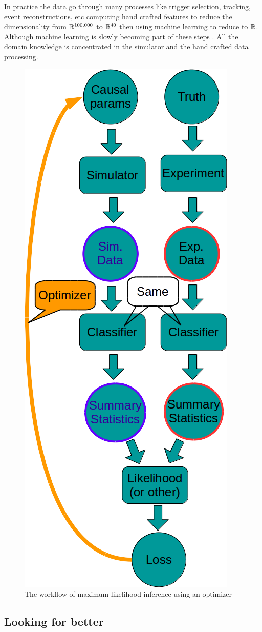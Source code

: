 In practice the data go through many processes like trigger selection, tracking, event reconstructions, etc computing hand crafted features to reduce the dimensionality from $\mathbb{R}^{100,000}$ to $\mathbb{R}^{40}$ then using machine learning to reduce to $\mathbb{R}$.
Although machine learning is slowly becoming part of these steps \needcite.
All the domain knowledge is concentrated in the simulator and the hand crafted data processing.


\begin{figure}[htb]
    \centering
    \includegraphics[width=0.5\linewidth]{workflow}
    \caption{The workflow of maximum likelihood inference using an optimizer}
    \label{fig:workflow}
\end{figure}





\subsection{Looking for better} %
\label{sub:looking_for_better}




